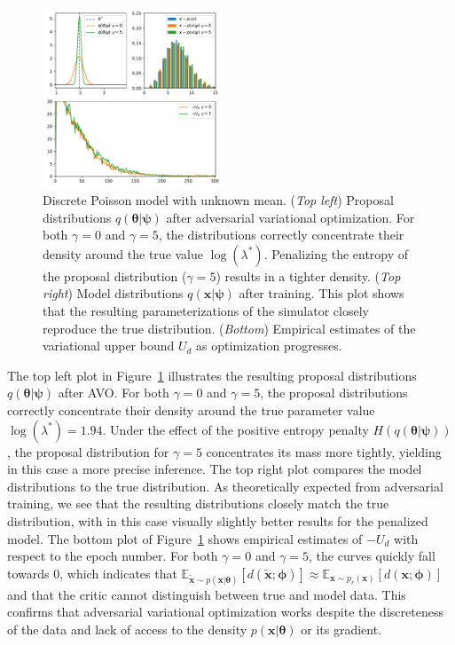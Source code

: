 \documentclass[twocolumn,superscriptaddress,aps]{revtex4-1}
\newcommand{\qxpsi}{q(\mathbf{x}|\bfpsi)}
\newcommand{\bftheta}{{\bm \theta}}
\newcommand{\bfpsi}{{\bm \psi}}
\newcommand{\bfphi}{{\bm \phi}}
\newcommand{\bfx}{\mathbf{x}}
\theoremstyle{plain}
\begin{document}
\begin{figure}
    \centering
    \includegraphics[width=0.48\textwidth]{figures/poisson.pdf}
    \caption{Discrete Poisson model with unknown mean.
             ({\it Top left}) Proposal distributions $q(\bftheta|\bfpsi)$ after adversarial variational optimization. For both $\gamma=0$ and $\gamma=5$, the distributions correctly concentrate their density around
                        the true value $\log(\lambda^*)$. Penalizing the entropy of the proposal distribution ($\gamma=5$) results in a tighter density.
             ({\it Top right}) Model distributions $\qxpsi$ after training. This plot shows that the resulting parameterizations of the simulator closely reproduce the true distribution.
             ({\it Bottom}) Empirical estimates of the variational upper bound $U_d$ as optimization progresses.
             }\label{fig:poisson}
\end{figure}

The top left plot in Figure~\ref{fig:poisson} illustrates the resulting proposal
distributions $q(\bftheta|\bfpsi)$ after AVO.  For
both $\gamma=0$ and $\gamma=5$, the proposal distributions correctly concentrate
their density around the true parameter value $\log(\lambda^*) = 1.94$. Under
the effect of the positive entropy penalty $H(q(\bftheta|\bfpsi))$,
the proposal distribution for $\gamma=5$ concentrates its mass more tightly,
yielding in this case a more precise inference.  The top right plot compares the
model distributions to the true distribution.  As theoretically expected from
adversarial training, we see that the resulting distributions closely match
the true distribution, with in this case visually slightly better results for the penalized
model.  The bottom plot of Figure~\ref{fig:poisson} shows empirical estimates
of $-U_d$ with respect to the epoch number. For both $\gamma=0$ and $\gamma=5$,
the curves quickly fall towards $0$, which indicates that
$\mathbb{E}_{\tilde{\mathbf{x}} \sim p(\mathbf{x}|\bftheta)}
[d(\tilde{\mathbf{x}};\bfphi)] \approx \mathbb{E}_{\mathbf{x} \sim
p_r(\mathbf{x})} [d(\mathbf{x};\bfphi)]$ and that the critic cannot distinguish
between true and model data. This confirms that adversarial variational optimization 
works despite the discreteness of the data and lack of access to the 
density $p(\bfx | \bftheta)$ or its gradient. 
\end{document}
